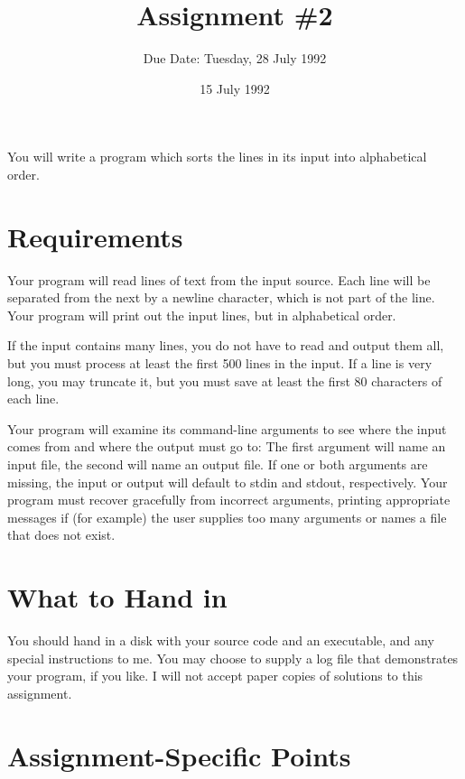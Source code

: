 

\title{Assignment \#2}
\author{Due Date: Tuesday, 28 July 1992}
\date{15 July 1992}

\parskip 5pt


\maketitle

    You will write a program which sorts the lines in its input into
alphabetical order.

\section{Requirements}

    Your program will read lines of text from the input source.  Each
line will be separated from the next by a newline character, which is
not part of the line.  Your program will print out the input lines, but
in alphabetical order.

    If the input contains many lines, you do not have to read and output
them all, but you must process at least the first 500 lines in the
input.  If a line is very long, you may truncate it, but you must save
at least the first 80 characters of each line.

    Your program will examine its command-line arguments to see where
the input comes from and where the output must go to: The first argument
will name an input file, the second will name an output file.  If one or
both arguments are missing, the input or output will default to stdin
and stdout, respectively.  Your program must recover gracefully from
incorrect arguments, printing appropriate messages if (for example) the
user supplies too many arguments or names a file that does not exist.

\section{What to Hand in}

You should hand in a disk with your source code and an executable, and
any special instructions to me.  You may choose to supply a log file
that demonstrates your program, if you like.  I will not accept paper
copies of solutions to this assignment.

\section{Assignment-Specific Points}

